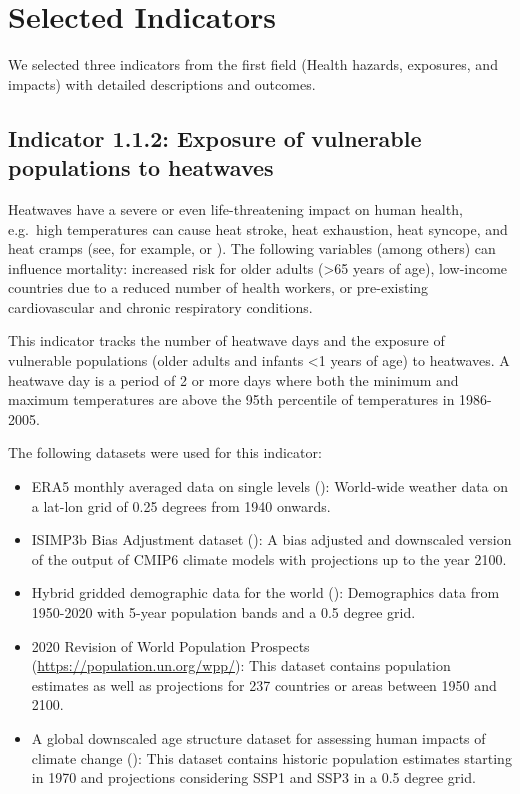 \documentclass[
]{krantz}
\providecommand{\tightlist}{%
  \setlength{\itemsep}{0pt}\setlength{\parskip}{0pt}}
\begin{document}
\section{Selected Indicators}\label{selected-indicators}

We selected three indicators from the first field (Health hazards, exposures, and impacts) with detailed descriptions and outcomes.

\subsection{Indicator 1.1.2: Exposure of vulnerable populations to heatwaves}\label{indicator-1.1.2-exposure-of-vulnerable-populations-to-heatwaves}

Heatwaves have a severe or even life-threatening impact on human health, e.g.~high temperatures can cause heat stroke, heat exhaustion, heat syncope, and heat cramps (see, for example, \citet{doi:10.1161/CIRCULATIONAHA.122.061832} or \citet{chambers2020}). The following variables (among others) can influence mortality: increased risk for older adults (\textgreater65 years of age), low-income countries due to a reduced number of health workers, or pre-existing cardiovascular and chronic respiratory conditions.

This indicator tracks the number of heatwave days and the exposure of vulnerable populations (older adults and infants \textless1 years of age) to heatwaves. A heatwave day is a period of 2 or more days where both the minimum and maximum temperatures are above the 95th percentile of temperatures in 1986-2005.

The following datasets were used for this indicator:

\begin{itemize}
\tightlist
\item
  ERA5 monthly averaged data on single levels (\citet{hersbach2020era5}): World-wide weather data on a lat-lon grid of 0.25 degrees from 1940 onwards.
\item
  ISIMP3b Bias Adjustment dataset (\citet{lange2021isimip3b}): A bias adjusted and downscaled version of the output of CMIP6 climate models with projections up to the year 2100.
\item
  Hybrid gridded demographic data for the world (\citet{Chambers_2020}): Demographics data from 1950-2020 with 5-year population bands and a 0.5 degree grid.
\item
  2020 Revision of World Population Prospects (\url{https://population.un.org/wpp/}): This dataset contains population estimates as well as projections for 237 countries or areas between 1950 and 2100.
\item
  A global downscaled age structure dataset for assessing human impacts of climate change (\citet{briggsdaviddownscaled}): This dataset contains historic population estimates starting in 1970 and projections considering SSP1 and SSP3 in a 0.5 degree grid.
\end{itemize}
\end{document}
